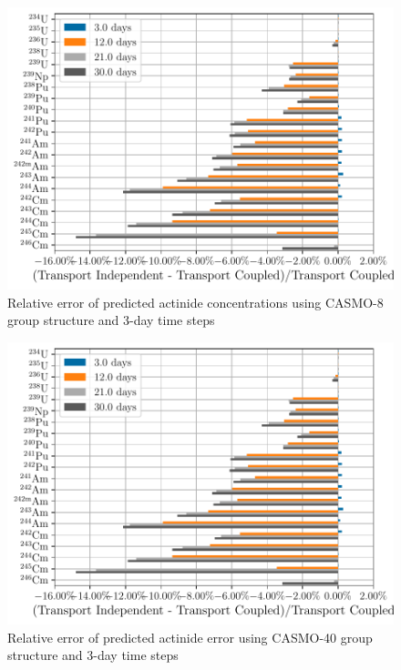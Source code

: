     \begin{figure}[h!tpb]
        \centering
        \includegraphics[width=\linewidth]{figs/actinides_casmo8_constant_xs_predictor_fission_q_days.pdf}
        \caption[]{Relative error of predicted actinide concentrations using
        CASMO-8 group structure and 3-day time steps}
        \label{fig:actinides-error-casmo8-xs-days}
    \end{figure}

    \begin{figure}[h!tpb]
        \centering
        \includegraphics[width=\linewidth]{figs/actinides_casmo40_constant_xs_predictor_fission_q_days.pdf}
        \caption{Relative error of predicted actinide error using
        CASMO-40 group structure and 3-day time steps}
        \label{fig:actinides-error-casmo40-xs-days}
    \end{figure}

